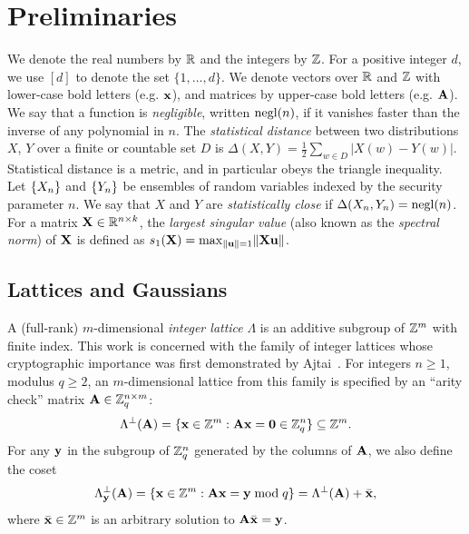 \section{Preliminaries}
\label{sec:preliminaries}
We denote the real numbers by $\mathbb{R}$ and the integers by $\mathbb{Z}$. For a
positive integer $d$, we use $[d]$ to denote the set $\{1, \ldots,
d\}$. We denote vectors over $\mathbb{R}$ and $\mathbb{Z}$ with lower-case bold
letters (e.g. $\mathbf{x}$), and matrices by upper-case bold letters
(e.g. $\mathbf{A}$). We say that a function is \emph{negligible}, written
$\operatorname{negl}(n)$, if it vanishes faster than the inverse of any polynomial
in $n$.  The \emph{statistical distance} between two distributions
$X$, $Y$ over a finite or countable set $D$ is
$\Delta(X,Y)=\frac{1}{2}\sum_{w\in D}|X(w)-Y(w)|$. Statistical
distance is a metric, and in particular obeys the triangle inequality.
Let $\{{X_{n}}\}$ and $\{{Y_{n}}\}$ be ensembles of random variables
indexed by the security parameter $n$. We say that $X$ and $Y$ are
\emph{statistically close} if $\Delta(X_{n},Y_{n}) = \operatorname{negl}(n)$.  For a
matrix $\mathbf{X} \in \mathbb{R}^{n \times k}$, the \emph{largest singular
  value} (also known as the \emph{spectral norm}) of $\mathbf{X}$ is
defined as $s_1(\mathbf{X}) = \max_{\lVert{\ensuremath{\mathbf{u}}}\rVert=1}\lVert{\ensuremath{\mathbf{X}}\ensuremath{\mathbf{u}}}\rVert$.

\subsection{Lattices and Gaussians}
\label{subsec:gaussians_lattices}

A (full-rank) $m$-dimensional \emph{integer lattice} $\Lambda$ is an
additive subgroup of $\mathbb{Z}^m$ with finite index.
This work is concerned with the family of integer lattices whose
cryptographic importance was first demonstrated by
Ajtai~\cite{ajtai04:_gener_hard_instan_lattic_probl}. For integers $n
\geq 1$, modulus $q \geq 2$, an $m$-dimensional lattice from this
family is specified by an ``arity check'' matrix $\mathbf{A} \in \mathbb{Z}_q^{n
  \times m}$:
\[\Lambda^{\perp}(\mathbf{A}) = \{{ \mathbf{x} \in \mathbb{Z}^m: \mathbf{A}\mathbf{x} = \mathbf{0}
  \in \mathbb{Z}_q^{n} }\} \subseteq \mathbb{Z}^m.\] For any $\mathbf{y}$ in the subgroup of
$\mathbb{Z}_q^{n}$ generated by the columns of $\mathbf{A}$, we also define the
coset
\[\Lambda_{\mathbf{y}}^{\perp}(\mathbf{A}) = \{{ \mathbf{x} \in \mathbb{Z}^m: \mathbf{A}\mathbf{x} =
  \mathbf{y} \bmod q}\} = \Lambda^{\perp}(\mathbf{A})+\bar{\mathbf{x}},\] where
$\bar{\mathbf{x}} \in \mathbb{Z}^m$ is an arbitrary solution to
$\mathbf{A}\bar{\mathbf{x}}=\mathbf{y}$.

